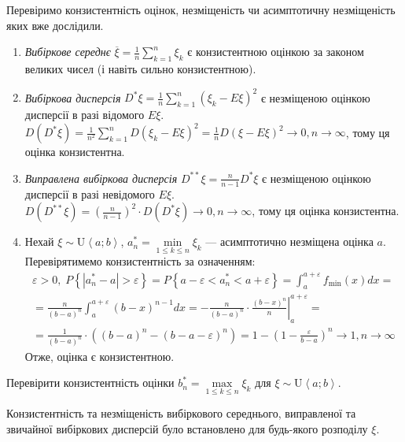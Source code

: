 \begin{example}
    Перевіримо конзистентність оцінок, незміщеність чи асимптотичну незміщеність яких вже дослідили.
    \begin{enumerate}
        \item \emph{Вибіркове середнє} $\overline{\xi} = \frac{1}{n}\sum\limits_{k=1}^n \xi_k$ є конзистентною оцінкою
        за законом великих чисел (і навіть сильно конзистентною).
        \item \emph{Вибіркова дисперсія} $D^*\xi = \frac{1}{n}\sum\limits_{k=1}^n \left(\xi_k - E\xi \right)^2$
        є незміщеною оцінкою дисперсії в разі відомого $E\xi$. 
        $D\left(D^*\xi\right) = \frac{1}{n^2}\sum\limits_{k=1}^n D\left(\xi_k - E\xi \right)^2 =
        \frac{1}{n} D\left(\xi - E\xi \right)^2 \to 0, n\to\infty$, тому ця оцінка конзистентна.
        \item \emph{Виправлена вибіркова дисперсія} $D^{**}\xi = \frac{n}{n-1} D^*\xi$ є незміщеною оцінкою дисперсії в разі невідомого $E\xi$. 
        $D\left(D^{**}\xi\right) = \left(\frac{n}{n-1} \right)^2 \cdot D\left(D^*\xi\right) \to 0, n\to\infty$, тому ця оцінка конзистентна.
        \item Нехай $\xi \sim \mathrm{U}\left< a; b\right>$, $a^*_n = \underset{1\leq k \leq n}{\min}\xi_k$ --- асимптотично незміщена оцінка $a$.
        Перевірятимемо конзистентність за означенням:
        \begin{gather*}
            \varepsilon > 0, \; P\left\{|a^*_n - a| > \varepsilon\right\} = 
            P\left\{a - \varepsilon < a^*_n < a + \varepsilon\right\} = \int_{a}^{a+\varepsilon} f_{\min}(x) dx = \\
            = \frac{n}{(b-a)^n}\int_{a}^{a+\varepsilon} (b-x)^{n-1} dx =
            -\frac{n}{(b-a)^n} \cdot \left. \frac{(b-x)^n}{n} \right|_{a}^{a+\varepsilon} = \\
            = \frac{1}{(b-a)^n} \cdot \left( (b-a)^n  - (b-a-\varepsilon)^n\right) = 
            1 - \left(1 - \frac{\varepsilon}{b-a}\right)^n \to 1, n\to\infty
        \end{gather*} 
        Отже, оцінка є конзистентною.
    \end{enumerate}
\end{example}
\begin{exercise}
    Перевірити конзистентність оцінки $b^*_n = \underset{1\leq k \leq n}{\max}\xi_k$ для $\xi \sim \mathrm{U}\left< a; b\right>$.
\end{exercise}
\begin{remark}
    Конзистентність та незміщеність вибіркового середнього, виправленої та звичайної вибіркових дисперсій було встановлено для будь-якого розподілу $\xi$.
\end{remark}

